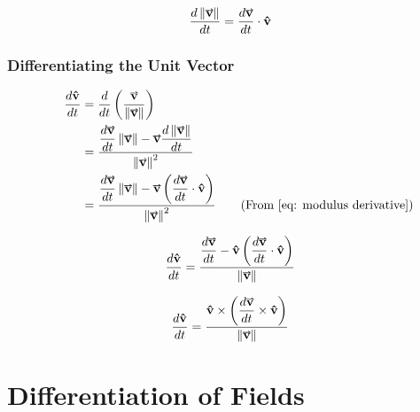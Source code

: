 \documentclass[main.tex]{subfiles}
\begin{document}
                    \begin{equation}
                        \frac{d\vmod{\vect{v}}}{dt} = \frac{d\vect{v}}{dt} \cdot \vhat{v}
                        \label{eq: modulus derivative}
                    \end{equation}

                    \vspace{10mm}

                \subsubsection{Differentiating the Unit Vector}
                    \label{subsubsec: Differentiating the Unit Vector}

                    \begin{align*}
                        \hspace{5mm}\frac{d\vhat{v}}{dt} &= \frac{d}{dt}\left(\frac{\vect{v}}{\vmod{\vect{v}}}\right)\\
                        &= \bfrac{\frac{d\vect{v}}{dt}\vmod{\vect{v}} - \vect{v}\frac{d\vmod{\vect{v}}}{dt}}{\vmod{\vect{v}}^2}\\
                        &= \bfrac{\frac{d\vect{v}}{dt}\vmod{\vect{v}} - \vect{v}\left(\frac{d\vect{v}}{dt} \cdot \vhat{v}\right)}{\vmod{\vect{v}}^2} \tag{\text{From \eqref{eq: modulus derivative}}}
                    \end{align*}
                    \vspace{5mm}

                    \begin{equation}
                        \frac{d\vhat{v}}{dt} = \bfrac{\frac{d\vect{v}}{dt} - \vhat{v}\left(\frac{d\vect{v}}{dt} \cdot \vhat{v}\right)}{\vmod{\vect{v}}}
                        \label{eq: unit vector derivative - projection}
                    \end{equation}
                    \hspace{3mm}

                    \begin{equation}
                        \frac{d\vhat{v}}{dt} = \bfrac{\vhat{v}\times\left(\frac{d\vect{v}}{dt} \times \vhat{v}\right)}{\vmod{\vect{v}}}
                        \label{eq: unit vector derivative - cross product}
                    \end{equation}

                \newpage
        \section{Differentiation of Fields}
            \label{sec: Differentiation of Fields}
\end{document}
